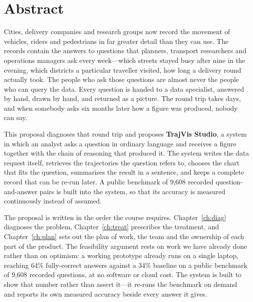 \documentclass[12pt,a4paper]{report}
\begin{document}
\chapter*{Abstract}

Cities, delivery companies and research groups now record the movement of
vehicles, riders and pedestrians in far greater detail than they can use.
The records contain the answers to questions that planners, transport
researchers and operations managers ask every week---which streets stayed busy
after nine in the evening, which districts a particular traveller visited, how
long a delivery round actually took. The people who ask those questions are
almost never the people who can query the data. Every question is handed to a
data specialist, answered by hand, drawn by hand, and returned as a picture.
The round trip takes days, and when somebody asks six months later how a figure
was produced, nobody can say.

This proposal diagnoses that round trip and proposes \textbf{TrajVis Studio}, a
system in which an analyst asks a question in ordinary language and receives a
figure together with the chain of reasoning that produced it. The system writes
the data request itself, retrieves the trajectories the question refers to,
chooses the chart that fits the question, summarises the result in a sentence,
and keeps a complete record that can be re-run later. A public benchmark of
9{,}608 recorded question-and-answer pairs is built into the system, so that its
accuracy is measured continuously instead of assumed.

The proposal is written in the order the course requires. Chapter~\ref{ch:diag}
diagnoses the problem, Chapter~\ref{ch:treat} prescribes the treatment, and
Chapter~\ref{ch:plan} sets out the plan of work, the team and the ownership of
each part of the product. The feasibility argument rests on work we have already
done rather than on optimism: a working prototype already runs on a single
laptop, reaching 64\% fully-correct answers against a 34\% baseline on a public
benchmark of 9{,}608 recorded questions, at no software or cloud cost. The
system is built to show that number rather than assert it---it re-runs the
benchmark on demand and reports its own measured accuracy beside every answer it
gives.
\end{document}
